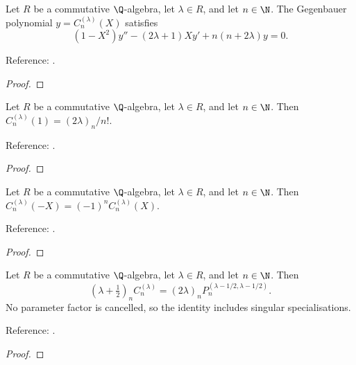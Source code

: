 \begin{theorem}
\label{thm:gegenbauer-ode}
\leanok
Let $R$ be a commutative $\Q$-algebra, let $\lambda\in R$, and let $n\in\N$. The Gegenbauer polynomial $y=C_n^{(\lambda)}(X)$ satisfies
\[(1-X^2)y''-(2\lambda+1)Xy'+n(n+2\lambda)y=0.\]


Reference: \cite[Table 18.8.1]{dlmf}.
\end{theorem}
\begin{proof}
\leanok
\end{proof}

\begin{theorem}
\label{thm:gegenbauer-value-one}
\leanok
Let $R$ be a commutative $\Q$-algebra, let $\lambda\in R$, and let $n\in\N$. Then
$C_n^{(\lambda)}(1)=(2\lambda)_n/n!$.

Reference: \cite[Table 18.6.1]{dlmf}.
\end{theorem}
\begin{proof}
\leanok
\end{proof}

\begin{theorem}
\label{thm:gegenbauer-parity}
\leanok
Let $R$ be a commutative $\Q$-algebra, let $\lambda\in R$, and let $n\in\N$. Then
$C_n^{(\lambda)}(-X)=(-1)^n C_n^{(\lambda)}(X)$.

Reference: \cite[Table 18.6.1]{dlmf}.
\end{theorem}
\begin{proof}
\leanok
\end{proof}

\begin{theorem}
\label{thm:gegenbauer-jacobi}
\leanok
Let $R$ be a commutative $\Q$-algebra, let $\lambda\in R$, and let $n\in\N$. Then
\[(\lambda+\tfrac12)_n C_n^{(\lambda)}
 =(2\lambda)_n P_n^{(\lambda-1/2,\lambda-1/2)}.\]
No parameter factor is cancelled, so the identity includes singular
specialisations.

Reference: \cite[18.7.1]{dlmf}.
\end{theorem}
\begin{proof}
\leanok
\end{proof}

